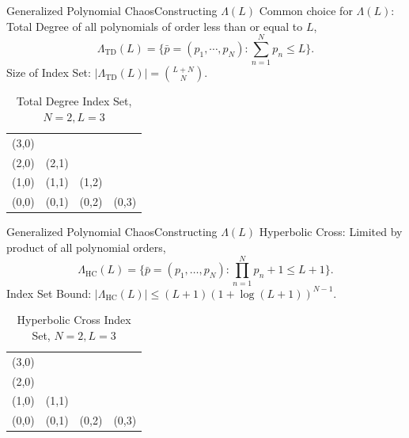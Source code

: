 \documentclass{beamer}
\begin{document}
\begin{frame}{Generalized Polynomial Chaos}{Constructing $\Lambda(L)$}%
  Common choice for $\Lambda(L)$: Total Degree of all polynomials of order less than or equal to $L$,
  \begin{equation*}
    \Lambda_\text{TD}(L)=\Big\{\bar p=(p_1,\cdots,p_N):\sum_{n=1}^N p_n \leq L\Big\}.
  \end{equation*}
  Size of Index Set: $|\Lambda_\text{TD}(L)|={L+N\choose N}$.
  \begin{table}[h]
    \centering
    \begin{tabular}{c c c c}
    (3,0) &       &       &       \\
    (2,0) & (2,1) &       &       \\
    (1,0) & (1,1) & (1,2) &       \\
    (0,0) & (0,1) & (0,2) & (0,3)
    \end{tabular}
    \caption{Total Degree Index Set, $N=2,L=3$}
    \label{tab:TD}
  \end{table}
\end{frame}

\begin{frame}{Generalized Polynomial Chaos}{Constructing $\Lambda(L)$}%
  Hyperbolic Cross: Limited by product of all polynomial orders,
  \begin{equation*}
    \Lambda_\text{HC}(L)=\Big\{\bar p=(p_1,\ldots,p_N):\prod_{n=1}^N p_n+1 \leq L+1\Big\}.
  \end{equation*}
  Index Set Bound: $|\Lambda_\text{HC}(L)|\leq (L+1)(1+\log(L+1))^{N-1}$.
  \begin{table}[h]
    \centering
    \begin{tabular}{c c c c}
    (3,0) &       &       &       \\
    (2,0) &       &       &       \\
    (1,0) & (1,1) &       &       \\
    (0,0) & (0,1) & (0,2) & (0,3)
    \end{tabular}
    \caption{Hyperbolic Cross Index Set, $N=2,L=3$}
    \label{tab:HC}
  \end{table}
\end{frame}
\end{document}
